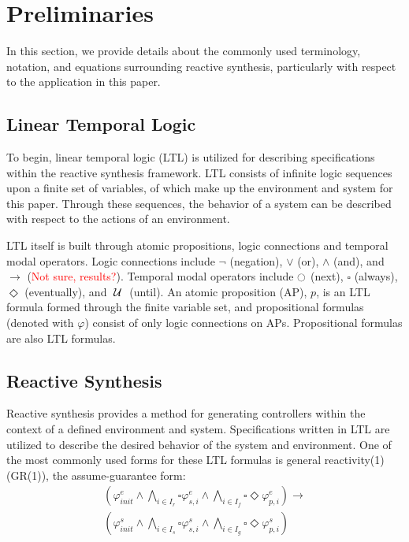 \documentclass[journal]{IEEEtran}
\newcommand{\always}{\square}
\newcommand{\eventually}{\Diamond}
\renewcommand{\next}{\ocircle}
\newcommand{\until}{\hspace{1mm}\mathcal{U}\hspace{1mm}}
\begin{document}
\section{Preliminaries}
In this section, we provide details about the commonly used terminology, notation, and equations surrounding reactive synthesis, particularly with respect to the application in this paper. 

\subsection{Linear Temporal Logic}
To begin, linear temporal logic (LTL) is utilized for describing specifications within the reactive synthesis framework. LTL consists of infinite logic sequences upon a finite set of variables, of which make up the environment and system for this paper. Through these sequences, the behavior of a system can be described with respect to the actions of an environment.

LTL itself is built through atomic propositions, logic connections and temporal modal operators. Logic connections include $\lnot$ (negation), $\lor$ (or), $\land$ (and),  and $\longrightarrow$ (\textcolor{red}{Not sure, results?}). Temporal modal operators include $\next$ (next), $\always$ (always), $\eventually$ (eventually), and $\until$ (until). An atomic proposition (AP), $p$, is an LTL formula formed through the finite variable set, and propositional formulas (denoted with $\varphi$) consist of only logic connections on APs. Propositional formulas are also LTL formulas. %

\subsection{Reactive Synthesis}
Reactive synthesis provides a method for generating controllers within the context of a defined environment and system. Specifications written in LTL are utilized to describe the desired behavior of the system and environment. One of the most commonly used forms for these LTL formulas is general reactivity(1) (GR(1)), the assume-guarantee form:
\begin{equation}
\begin{aligned}
(\varphi_{init}^{e} \land \bigwedge_{i \in I_r} \always \varphi_{s,i}^{e} \land \bigwedge_{i \in I_f} \always \eventually \varphi_{p,i}^{e}) \longrightarrow \\ (\varphi_{init}^{s} \land \bigwedge_{i \in I_s} \always \varphi_{s,i}^{s} \land \bigwedge_{i \in I_g} \always \eventually \varphi_{p,i}^{s})
\end{aligned}
\end{equation}
\end{document}
